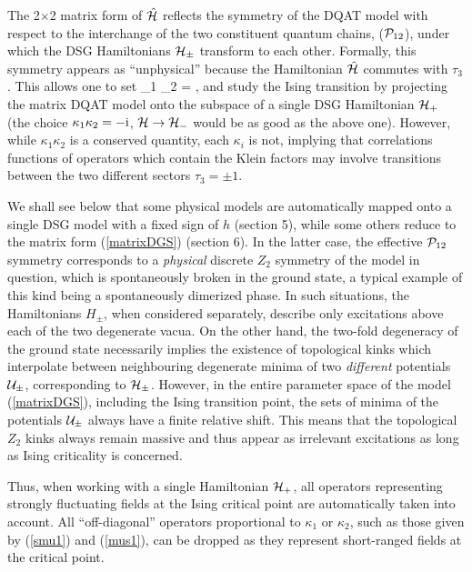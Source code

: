 The  2$\times$2 matrix form of $\hat{\cal H}$ reflects the 
symmetry of the DQAT model 
with respect to the interchange 
of the two constituent quantum chains, (${\cal P}_{12}$),
under which the DSG Hamiltonians ${\cal H}_{\pm}$ transform to each other.
Formally, this symmetry appears as ``unphysical'' because the Hamiltonian 
$\hat{\cal H}$ commutes with $\tau_3$.
This allows one to set
\be
\kappa_1 \kappa_2 = \ri, \label{proj-H+}
\ee
and 
study the Ising transition by
projecting the matrix DQAT model onto the subspace
of a single DSG Hamiltonian ${\cal H}_+$
(the choice $\kappa_1 \kappa_2 = -\mbox{i}$, ${\cal H} \rightarrow {\cal H}_-$
would be as good as the above one). However, while 
$\kappa_1\kappa_2$ is a conserved quantity, each $\kappa_i$ is not, 
implying that correlations functions of operators which contain 
the Klein factors may involve transitions between the two different 
sectors $\tau_3=\pm 1$. 

We shall see below that some physical models are automatically mapped onto
a single DSG model with a fixed sign of $h$ (section 5),
while some others reduce to the matrix form
(\ref{matrixDGS}) (section 6). 
In the latter case,
the effective ${\cal P}_{12}$ symmetry corresponds to
a {\sl physical} discrete $Z_2$ symmetry of
the model in question, which is spontaneously broken in the ground state,
a typical example of this kind being a spontaneously dimerized phase. 
In such situations, the Hamiltonians
$H_{\pm}$, when considered separately, describe only
excitations above each of the two degenerate vacua. On the other hand,
the two-fold degeneracy of the ground state necessarily implies
the existence of topological kinks
which interpolate between neighbouring degenerate minima of 
two {\sl different} potentials ${\cal U}_{\pm}$, corresponding to
${\cal H}_{\pm}$. However, 
in the entire parameter space of the model (\ref{matrixDGS}),
including the Ising transition point, the sets of minima of the potentials
${\cal U}_{\pm}$ always have a finite relative shift. This means that
the topological $Z_2$ kinks always remain massive and 
thus appear as irrelevant excitations as long as Ising criticality
is concerned.

Thus, when working with a single Hamiltonian ${\cal H}_+$,
all operators 
representing strongly fluctuating fields at the Ising critical point
are automatically taken into account. All ``off-diagonal'' operators 
proportional
to $\kappa_1$ or $\kappa_2$, such as those given by (\ref{smu1}) and 
(\ref{mus1}),
can be dropped as they represent short-ranged fields
at the critical point.

